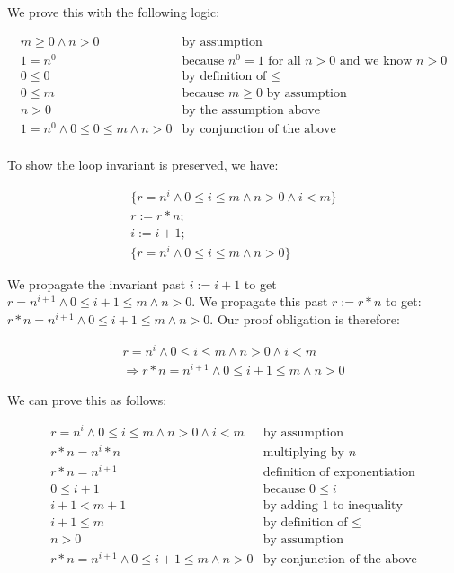 \documentclass[11pt]{article}
\begin{document}
We prove this with the following logic:

\[
\begin{array}{ll}
m \ge 0 \land n > 0 & \mbox{by assumption}\\
1=n^0 & \mbox{because $n^0=1$ for all $n>0$ and we know $n>0$}\\
0 \le 0 & \mbox{by definition of $\le$}\\
0 \le m & \mbox{because $m \ge 0$ by assumption}\\
n > 0 & \mbox{by the assumption above}\\
1=n^0 \land 0 \le 0 \le m \land n > 0 & \mbox{by conjunction of the above}\\
\end{array}
\]

To show the loop invariant is preserved, we have:

\[
\begin{array}{l}
\{ r=n^i \land 0 \le i \le m \land n > 0  \land i < m\}\\
r := r*n;\\
i := i+1;\\
\{ r=n^i \land 0 \le i \le m \land n > 0 \}
\end{array}
\]

We propagate the invariant past $i:=i+1$ to get $r=n^{i+1} \land 0 \le i+1 \le m
\land n > 0$.  We propagate this past $r:=r*n$ to get: $r*n=n^{i+1} \land 0 \le
i+1 \le m \land n > 0$.  Our proof obligation is therefore:

\[
\begin{array}{l}
r=n^i \land 0 \le i \le m \land n > 0  \land i < m\\
\Rightarrow r*n=n^{i+1} \land 0 \le i+1 \le m \land n > 0
\end{array}
\]

We can prove this as follows:

\[
\begin{array}{ll}
r=n^i \land 0 \le i \le m \land n > 0  \land i < m & \mbox{by assumption}\\
r*n=n^i*n & \mbox{multiplying by $n$}\\
r*n=n^{i+1} & \mbox{definition of exponentiation}\\
0 \le i+1 & \mbox{because $0 \le i$}\\
i+1 < m+1 & \mbox{by adding 1 to inequality}\\
i+1 \le m & \mbox{by definition of $\le$}\\
n>0 & \mbox{by assumption}\\
r*n=n^{i+1} \land 0 \le i+1 \le m \land n > 0& \mbox{by conjunction of the above}\\
\end{array}
\]
\end{document}

